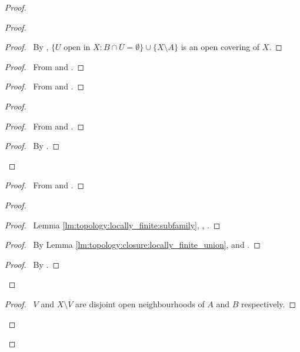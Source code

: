 \documentclass{report}
\let\qed\relax
\theoremstyle{definition}
\begin{document}
\begin{proof}
\begin{proof}
    \begin{proof}
      \pf\ By , $\{ U \text{ open in } X : B \cap \overline{U} = \emptyset \} \cup \{ X \setminus A \}$ is an open covering of $X$.
    \end{proof}
    \begin{proof}
      \pf\ From  and .
    \end{proof}
    \begin{proof}
      \pf\ From  and .
    \end{proof}
    \begin{proof}
      \begin{proof}
        \pf\ From  and .
      \end{proof}
      \qedstep
      \begin{proof}
        \pf\ By .
      \end{proof}
    \end{proof}
    \begin{proof}
      \pf\ From  and .
    \end{proof}
    \begin{proof}
      \begin{proof}
        \pf\ Lemma \ref{lm:topology:locally_finite:subfamily}, , .
      \end{proof}
      \begin{proof}
        \pf\ By Lemma \ref{lm:topology:closure:locally_finite_union},  and .
      \end{proof}
      \qedstep
      \begin{proof}
        \pf\ By .
      \end{proof}
    \end{proof}
    \qedstep
    \begin{proof}
      \pf\ $V$ and $X \setminus \overline{V}$ are disjoint open neighbourhoods of $A$ and $B$ respectively.
    \end{proof}
  \end{proof}
  \qed
\end{proof}
\end{document}
